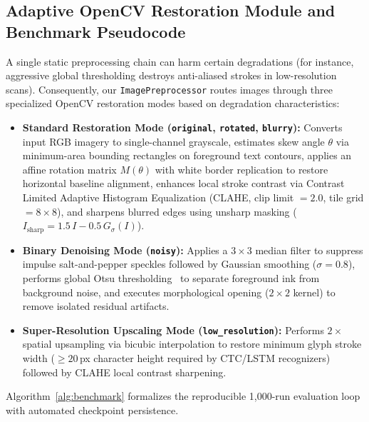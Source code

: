 \documentclass[11pt,a4paper]{article}
\begin{document}
\subsection{Adaptive OpenCV Restoration Module and Benchmark Pseudocode}
A single static preprocessing chain can harm certain degradations (for instance, aggressive global thresholding destroys anti-aliased strokes in low-resolution scans). Consequently, our \texttt{ImagePreprocessor} routes images through three specialized OpenCV restoration modes based on degradation characteristics:
\begin{itemize}[leftmargin=1.4em]
    \item \textbf{Standard Restoration Mode (\texttt{original}, \texttt{rotated}, \texttt{blurry}):} Converts input RGB imagery to single-channel grayscale, estimates skew angle $\theta$ via minimum-area bounding rectangles on foreground text contours, applies an affine rotation matrix $M(\theta)$ with white border replication to restore horizontal baseline alignment, enhances local stroke contrast via Contrast Limited Adaptive Histogram Equalization (CLAHE, clip limit $= 2.0$, tile grid $= 8 \times 8$), and sharpens blurred edges using unsharp masking ($I_{\text{sharp}} = 1.5\,I - 0.5\,G_{\sigma}(I)$).
    \item \textbf{Binary Denoising Mode (\texttt{noisy}):} Applies a $3 \times 3$ median filter to suppress impulse salt-and-pepper speckles followed by Gaussian smoothing ($\sigma = 0.8$), performs global Otsu thresholding~\cite{otsu1979threshold} to separate foreground ink from background noise, and executes morphological opening ($2 \times 2$ kernel) to remove isolated residual artifacts.
    \item \textbf{Super-Resolution Upscaling Mode (\texttt{low\_resolution}):} Performs $2\times$ spatial upsampling via bicubic interpolation to restore minimum glyph stroke width ($\ge 20$\,px character height required by CTC/LSTM recognizers) followed by CLAHE local contrast sharpening.
\end{itemize}

Algorithm~\ref{alg:benchmark} formalizes the reproducible 1,000-run evaluation loop with automated checkpoint persistence.
\end{document}
